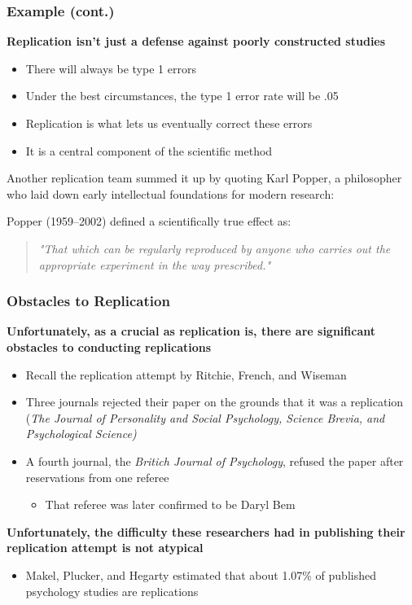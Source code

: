 \documentclass[10pt, block=fill]{beamer}
\begin{document}
\begin{frame}
    \frametitle{Example (cont.)}
    
    \textbf{Replication isn't just a defense against poorly constructed studies}
    \begin{itemize}
        \item There will always be type 1 errors
        \item Under the best circumstances, the type 1 error rate will be .05
        \item Replication is what lets us eventually correct these errors
        \item It is a central component of the scientific method
    \end{itemize}

    \vspace{0.25in}
    
    Another replication team summed it up by quoting Karl Popper, a philosopher who laid down early intellectual foundations for modern research:
    
    Popper (1959–2002) defined a scientifically true effect as:
    \begin{quote}
        \textit{"That which can be regularly reproduced by anyone who carries out the appropriate experiment in the way prescribed." }
    \end{quote}

\end{frame}


\begin{frame}
    \frametitle{Obstacles to Replication}
    
    \textbf{Unfortunately, as a crucial as replication is, there are significant obstacles to conducting replications}
    \begin{itemize}
        \item Recall the replication attempt by Ritchie, French, and Wiseman
        \item Three journals rejected their paper on the grounds that it was a replication (\textit{The Journal of Personality and Social Psychology, Science Brevia, and Psychological Science)  }
        \item A fourth journal, the \textit{Britich Journal of Psychology}, refused the paper after reservations from one referee
        \begin{itemize}
            \item That referee was later confirmed to be Daryl Bem
        \end{itemize}
    \end{itemize}
    
        \textbf{Unfortunately, the difficulty these researchers had in publishing their replication attempt is not atypical}
    \begin{itemize}
        \item Makel, Plucker, and Hegarty estimated that about 1.07\% of published psychology studies are replications
    \end{itemize}
    
\end{frame}
\end{document}
